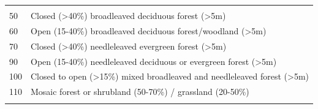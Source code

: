 \documentclass[11pt,]{article}
\begin{document}
\begin{longtable}[]{@{}ll@{}}
\begin{minipage}[t]{0.86\columnwidth}
\end{minipage}\tabularnewline
\begin{minipage}[t]{0.08\columnwidth}\raggedright\strut
50\strut
\end{minipage} & \begin{minipage}[t]{0.86\columnwidth}\raggedright\strut
Closed (\textgreater{}40\%) broadleaved deciduous forest
(\textgreater{}5m)\strut
\end{minipage}\tabularnewline
\begin{minipage}[t]{0.08\columnwidth}\raggedright\strut
60\strut
\end{minipage} & \begin{minipage}[t]{0.86\columnwidth}\raggedright\strut
Open (15-40\%) broadleaved deciduous forest/woodland
(\textgreater{}5m)\strut
\end{minipage}\tabularnewline
\begin{minipage}[t]{0.08\columnwidth}\raggedright\strut
70\strut
\end{minipage} & \begin{minipage}[t]{0.86\columnwidth}\raggedright\strut
Closed (\textgreater{}40\%) needleleaved evergreen forest
(\textgreater{}5m)\strut
\end{minipage}\tabularnewline
\begin{minipage}[t]{0.08\columnwidth}\raggedright\strut
90\strut
\end{minipage} & \begin{minipage}[t]{0.86\columnwidth}\raggedright\strut
Open (15-40\%) needleleaved deciduous or evergreen forest
(\textgreater{}5m)\strut
\end{minipage}\tabularnewline
\begin{minipage}[t]{0.08\columnwidth}\raggedright\strut
100\strut
\end{minipage} & \begin{minipage}[t]{0.86\columnwidth}\raggedright\strut
Closed to open (\textgreater{}15\%) mixed broadleaved and needleleaved
forest (\textgreater{}5m)\strut
\end{minipage}\tabularnewline
\begin{minipage}[t]{0.08\columnwidth}\raggedright\strut
110\strut
\end{minipage} & \begin{minipage}[t]{0.86\columnwidth}\raggedright\strut
Mosaic forest or shrubland (50-70\%) / grassland (20-50\%)\strut
\end{minipage}\tabularnewline
\begin{minipage}[t]{0.08\columnwidth}\raggedright\strut

\end{minipage}
\end{longtable}
\end{document}
